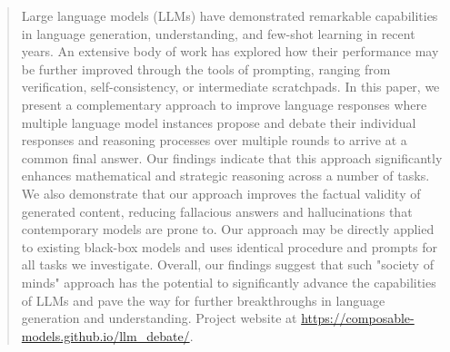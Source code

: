 \begin{abstract}
    Large language models (LLMs) have demonstrated remarkable capabilities in language generation, understanding, and few-shot learning in recent years. An extensive body of work has explored how their performance may be further improved through the tools of prompting, ranging from verification, self-consistency, or intermediate scratchpads. 
    In this paper, we present a complementary approach to improve language responses 
    where multiple language model instances propose and debate their individual responses and reasoning processes over multiple rounds to arrive at a common final answer.
    Our findings indicate that this approach significantly enhances mathematical and strategic reasoning across a number of tasks. We also demonstrate that our approach improves the factual validity of generated content, reducing fallacious answers and hallucinations that contemporary models are prone to. Our approach may be directly applied to existing black-box models and uses identical procedure and prompts for all tasks we investigate.
    Overall, our findings suggest that such "society of minds" approach has the potential to significantly advance the capabilities of LLMs and pave the way for further breakthroughs in language generation and understanding. Project website at \url{https://composable-models.github.io/llm_debate/}.
    
\end{abstract}
